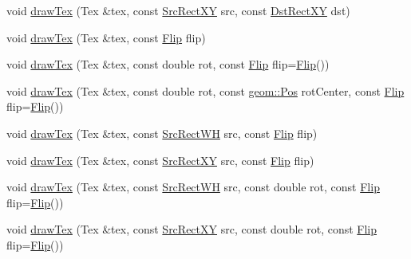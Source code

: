 \begin{DoxyCompactItemize}
\item 
void \mbox{\hyperlink{classrolmodl_1_1blend_mode_1_1_ren_a321171aab3a41715572a3d8fe0e557dd}{draw\+Tex}} (Tex \&tex, const \mbox{\hyperlink{structrolmodl_1_1blend_mode_1_1_src_rect_x_y}{Src\+Rect\+XY}} src, const \mbox{\hyperlink{structrolmodl_1_1blend_mode_1_1_dst_rect_x_y}{Dst\+Rect\+XY}} dst)
\item 
void \mbox{\hyperlink{classrolmodl_1_1blend_mode_1_1_ren_a1bfd523ccd66499aadbac44943452a5d}{draw\+Tex}} (Tex \&tex, const \mbox{\hyperlink{structrolmodl_1_1blend_mode_1_1_flip}{Flip}} flip)
\item 
void \mbox{\hyperlink{classrolmodl_1_1blend_mode_1_1_ren_aaadddb46a04e91f920e9585d3b4b94fa}{draw\+Tex}} (Tex \&tex, const double rot, const \mbox{\hyperlink{structrolmodl_1_1blend_mode_1_1_flip}{Flip}} flip=\mbox{\hyperlink{structrolmodl_1_1blend_mode_1_1_flip}{Flip}}())
\item 
void \mbox{\hyperlink{classrolmodl_1_1blend_mode_1_1_ren_ac7757a8eb59e1ad23fc8475c8ccc2dc6}{draw\+Tex}} (Tex \&tex, const double rot, const \mbox{\hyperlink{structrolmodl_1_1geom_1_1_pos}{geom\+::\+Pos}} rot\+Center, const \mbox{\hyperlink{structrolmodl_1_1blend_mode_1_1_flip}{Flip}} flip=\mbox{\hyperlink{structrolmodl_1_1blend_mode_1_1_flip}{Flip}}())
\item 
void \mbox{\hyperlink{classrolmodl_1_1blend_mode_1_1_ren_a874a1f1882ac76390a5c9581d94a17be}{draw\+Tex}} (Tex \&tex, const \mbox{\hyperlink{structrolmodl_1_1blend_mode_1_1_src_rect_w_h}{Src\+Rect\+WH}} src, const \mbox{\hyperlink{structrolmodl_1_1blend_mode_1_1_flip}{Flip}} flip)
\item 
void \mbox{\hyperlink{classrolmodl_1_1blend_mode_1_1_ren_a0a8de5df2b222bce8aa536d005f140a8}{draw\+Tex}} (Tex \&tex, const \mbox{\hyperlink{structrolmodl_1_1blend_mode_1_1_src_rect_x_y}{Src\+Rect\+XY}} src, const \mbox{\hyperlink{structrolmodl_1_1blend_mode_1_1_flip}{Flip}} flip)
\item 
void \mbox{\hyperlink{classrolmodl_1_1blend_mode_1_1_ren_aca7bffd9cca6886d1573538e85e37f8e}{draw\+Tex}} (Tex \&tex, const \mbox{\hyperlink{structrolmodl_1_1blend_mode_1_1_src_rect_w_h}{Src\+Rect\+WH}} src, const double rot, const \mbox{\hyperlink{structrolmodl_1_1blend_mode_1_1_flip}{Flip}} flip=\mbox{\hyperlink{structrolmodl_1_1blend_mode_1_1_flip}{Flip}}())
\item 
void \mbox{\hyperlink{classrolmodl_1_1blend_mode_1_1_ren_aec65d9d229a68839254ca46c1159c5da}{draw\+Tex}} (Tex \&tex, const \mbox{\hyperlink{structrolmodl_1_1blend_mode_1_1_src_rect_x_y}{Src\+Rect\+XY}} src, const double rot, const \mbox{\hyperlink{structrolmodl_1_1blend_mode_1_1_flip}{Flip}} flip=\mbox{\hyperlink{structrolmodl_1_1blend_mode_1_1_flip}{Flip}}())

\end{DoxyCompactItemize}
